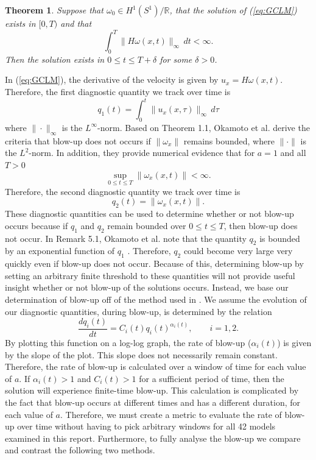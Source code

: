 \documentclass[12pt]{article}
\newtheorem{thm}{Theorem}[section]
\def\w{\omega}
\def\wx{\omega_x}
\def\R{\mathbb{R}}
\numberwithin{equation}{section}
\begin{document}
\begin{thm}\label{thm:Theorem:3.2}
Suppose that $\w_0\in H^1(S^1)/\R$, that the solution of (\ref{eq:GCLM}) exists in $[0,T)$ and that 
$$\int_0^T \|H\w(x,t)\|_{\infty}\,dt < \infty.$$
Then the solution exists in $0\leq t\leq T+\delta$ for some $\delta>0$.
\end{thm}
\noindent
In (\ref{eq:GCLM}), the derivative of the velocity is given by $u_x = H\w(x,t)$. Therefore, the first diagnostic quantity we track over time is 
\begin{equation}\label{eq:LINF}
q_1(t) = \int_0^t \|u_x(x,\tau)\|_{\infty}\,d\tau
\end{equation}
where $\|\cdot\|_{\infty}$ is the $L^{\infty}$-norm. Based on Theorem 1.1, Okamoto et al. derive the criteria that blow-up does not occurs if $\|\wx\|$ remains bounded, where $\|\cdot\|$ is the $L^2$-norm. In addition, they provide numerical evidence that for $a=1$ and all $T>0$
\begin{equation}
\sup_{0\leq t\leq T}\|\wx(x,t)\| < \infty.
\end{equation}
Therefore, the second diagnostic quantity we track over time is
\begin{equation}
q_2(t) = \|\wx(x,t)\|.
\end{equation}
\noindent
These diagnostic quantities can be used to determine whether or not blow-up occurs because if $q_1$ and $q_2$ remain bounded over $0\leq t\leq T$, then blow-up does not occur. In Remark 5.1, Okamoto et al. note that the quantity $q_2$ is bounded by an exponential function of $q_1$ \cite{okamoto_generalization_2008}. Therefore, $q_2$ could become very large very quickly even if blow-up does not occur. Because of this, determining blow-up by setting an arbitrary finite threshold to these quantities will not provide useful insight whether or not blow-up of the solutions occurs. Instead, we base our determination of blow-up off of the method used in \cite{zhao_systematic_2023}. We assume the evolution of our diagnostic quantities, during blow-up, is determined by the relation
\begin{equation}\label{eq:Diagnostic:Relation}
\frac{dq_i(t)}{dt} = C_i(t)q_i(t)^{\alpha_i(t)}, \qquad i=1,2.
\end{equation}
By plotting this function on a log-log graph, the rate of blow-up ($\alpha_i(t)$) is given by the slope of the plot. This slope does not necessarily remain constant. Therefore, the rate of blow-up is calculated over a window of time for each value of $a$. If $\alpha_i(t)>1$ and $C_i(t)>1$ for a sufficient period of time, then the solution will experience finite-time blow-up. This calculation is complicated by the fact that blow-up occurs at different times and has a different duration, for each value of $a$. Therefore, we must create a metric to evaluate the rate of blow-up over time without having to pick arbitrary windows for all 42 models examined in this report. Furthermore, to fully analyse the blow-up we compare and contrast the following two methods.
\end{document}
